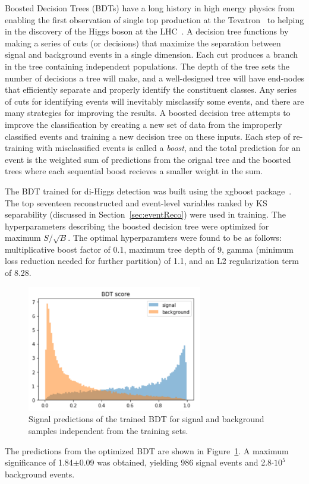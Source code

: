 \label{sec:BDT}
Boosted Decision Trees (BDTs) have a long history in high energy physics from enabling the first observation of single top production at the Tevatron~\cite{Abazov:2006gd, Aaltonen:2008sy} to helping in the discovery of the Higgs boson at the LHC~\cite{Aad_2012, Chatrchyan_2012}. A decision tree functions by making a series of cuts (or decisions) that maximize the separation between signal and background events in a single dimension. Each cut produces a branch in the tree containing independent populations. The depth of the tree sets the number of decisions a tree will make, and a well-designed tree will have end-nodes that efficiently separate and properly identify the constituent classes. Any series of cuts for identifying events will inevitably misclassify some events, and there are many strategies for improving the results. A boosted decision tree attempts to improve the classification by creating a new set of data from the improperly classified events and training a new decision tree on these inputs. Each step of re-training with misclassified events is called a \textit{boost}, and the total prediction for an event is the weighted sum of predictions from the orignal tree and the boosted trees where each sequential boost recieves a smaller weight in the sum.

The BDT trained for di-Higgs detection was built using the xgboost package~\cite{xgboost}. The top seventeen reconstructed and event-level variables ranked by KS separability (discussed in Section~\ref{sec:eventReco}) were used in training. The hyperparameters describing the boosted decision tree were optimized for maximum $S/\sqrt{B}$. The optimal hyperparamters were found to be as follows: multiplicative boost factor of 0.1, maximum tree depth of 9, gamma (minimum loss reduction needed for further partition) of 1.1, and an L2 regularization term of 8.28.

\begin{figure}[!h]
\begin{center}
\includegraphics[width=3in]{BDT/bdt_pred}
\caption{Signal predictions of the trained BDT for signal and background samples independent from the training sets.}
\label{fig:bdt_pred}
\end{center}
\end{figure}

The predictions from the optimized BDT are shown in Figure~\ref{fig:bdt_pred}. A maximum significance of 1.84$\pm$0.09 was obtained, yielding 986 signal events and 2.8$\cdot 10^5$ background events. 
